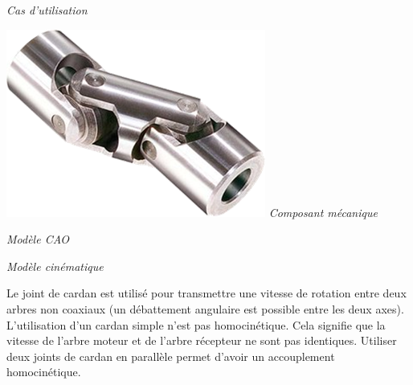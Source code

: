 \documentclass[11pt,oneside]{article}
\begin{document}
\begin{center}
\hfill
\begin{minipage}[c]{.21\linewidth}
\begin{center}
\textit{Cas d'utilisation}
\end{center}
\end{minipage} \hfill
\begin{minipage}[c]{.21\linewidth}
\begin{center}
\includegraphics[width=.9\textwidth]{png/cardan2}
\textit{Composant mécanique\cite{cardan2}}
\end{center}
\end{minipage} \hfill
\begin{minipage}[c]{.21\linewidth}
\begin{center}
\textit{Modèle CAO}
\end{center} 
\end{minipage}\hfill
\begin{minipage}[c]{.21\linewidth}
\begin{center}
\textit{Modèle cinématique}
\end{center} 
\end{minipage}\hfill
\end{center}

Le joint de cardan est utilisé pour transmettre une vitesse de rotation entre deux arbres non coaxiaux (un débattement angulaire est possible entre les deux axes). L'utilisation d'un cardan simple n'est pas homocinétique. Cela signifie que la vitesse de l'arbre moteur et de l'arbre récepteur ne sont pas identiques. Utiliser deux joints de cardan en parallèle permet d'avoir un accouplement homocinétique.
\end{document}
